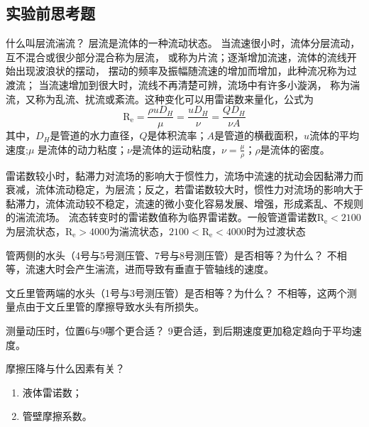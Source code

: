 \documentclass[dvipsnames, svgnames,a4paper,11pt]{article}
\begin{document}
\subsection{实验前思考题}
\begin{question}
	什么叫层流湍流？
	\tcblower
	层流是流体的一种流动状态。
	当流速很小时，流体分层流动，互不混合或很少部分混合称为层流，
	或称为片流；逐渐增加流速，流体的流线开始出现波浪状的摆动，
	摆动的频率及振幅随流速的增加而增加，此种流况称为过渡流；
	当流速增加到很大时，流线不再清楚可辨，流场中有许多小漩涡，
	称为湍流，又称为乱流、扰流或紊流。这种变化可以用雷诺数来量化，公式为
	$$\text{R}_\text{e}=\frac{\rho uD_H}{\mu}=\frac{uD_H}{\nu}=\frac{QD_H}{\nu A}$$
	其中，$D_H$是管道的水力直径，$Q$是体积流率；$A$是管道的横截面积，$u$流体的平均速度;$\mu$
	是流体的动力粘度；$\nu$是流体的运动粘度，$\nu=\frac{\mu}{\rho}$；$\rho$是流体的密度。

	雷诺数较小时，黏滞力对流场的影响大于惯性力，流场中流速的扰动会因黏滞力而衰减，流体流动稳定，为层流；反之，若雷诺数较大时，惯性力对流场的影响大于黏滞力，流体流动较不稳定，流速的微小变化容易发展、增强，形成紊乱、不规则的湍流流场。
	流态转变时的雷诺数值称为临界雷诺数。一般管道雷诺数$\text{R}_\text{e}<2100$为层流状态，$\text{R}_\text{e}>4000$为湍流状态，$2100<\text{R}_\text{e}<4000$时为过渡状态
\end{question}

\begin{question}
	管两侧的水头（4号与5号测压管、7号与8号测压管）是否相等？为什么？
	\tcblower
	不相等，流速大时会产生湍流，进而导致有垂直于管轴线的速度。
\end{question}

\begin{question}
	文丘里管两端的水头（1号与3号测压管）是否相等？为什么？
	\tcblower
	不相等，这两个测量点由于文丘里管的摩擦导致水头有所损失。
\end{question}

\begin{question}
	测量动压时，位置6与9哪个更合适？
	\tcblower
	9更合适，到后期速度更加稳定趋向于平均速度。
\end{question}

\begin{question}
	摩擦压降与什么因素有关？
	\tcblower
	\begin{enumerate}
		\item 液体雷诺数；
		\item 管壁摩擦系数。
	\end{enumerate}
\end{question}
\end{document}
